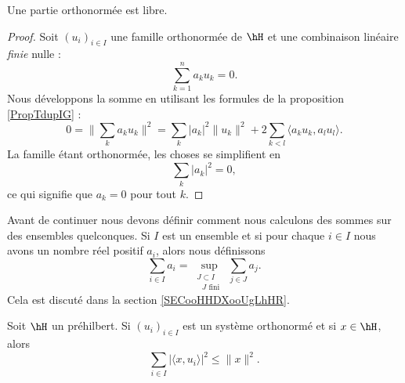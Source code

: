 \begin{proposition}     \label{PROPooMOQRooCPFnPC}
    Une partie orthonormée est libre.
\end{proposition}

\begin{proof}
    Soit \( (u_i)_{i\in I}\) une famille orthonormée de \( \hH\) et une combinaison linéaire \emph{finie} nulle :
    \begin{equation}
        \sum_{k=1}^{n}a_ku_k=0.
    \end{equation}
    Nous développons la somme en utilisant les formules de la proposition \ref{PropTdupIG} :
    \begin{equation}
        0=\| \sum_ka_ku_k \|^2=\sum_k| a_k |^2\| u_k \|^2+2\sum_{k<l}\langle a_ku_k, a_lu_l\rangle .
    \end{equation}
    La famille étant orthonormée, les choses se simplifient en
    \begin{equation}
        \sum_k| a_k |^2=0,
    \end{equation}
    ce qui signifie que \( a_k=0\) pour tout \( k\).
\end{proof}

Avant de continuer nous devons définir comment nous calculons des sommes sur des ensembles quelconques. Si \( I\) est un ensemble et si pour chaque \( i\in I\) nous avons un nombre réel positif \( a_i\), alors nous définissons
\begin{equation}
    \sum_{i\in I}a_i=\sup_{\substack{J\subset I\\\text{ } J\text{ fini }}}\sum_{j\in J} a_j.
\end{equation}
Cela est discuté dans la section \ref{SECooHHDXooUgLhHR}.

\begin{proposition}    \label{PropHKqVHj}
    Soit \( \hH\) un préhilbert. Si \( (u_i)_{i\in I}\) est un système orthonormé et si \( x\in \hH\), alors
    \begin{equation}        \label{EQooWCYZooOPzGaw}
        \sum_{i\in I}\big| \langle x, u_i\rangle  \big|^2\leq \| x \|^2.
    \end{equation}
\end{proposition}

